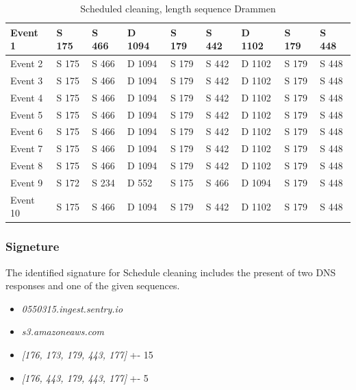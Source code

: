 \begin{table}[H]
\centering
\caption{ Scheduled cleaning, length sequence Drammen}
\label{tab:SCsequenceDrammen}
\begin{tabular}{|l|l|l|l|l|l|l|l|l|}
\hline
Event 1  & S 175   & S 466 & D 1094 & S 179 & S 442 & D 1102 & S 179 & S 448 \\ \hline
Event 2  & S 175   & S 466 & D 1094 & S 179 & S 442 & D 1102 & S 179 & S 448 \\ \hline
Event 3  & S 175   & S 466 & D 1094 & S 179 & S 442 & D 1102 & S 179 & S 448 \\ \hline
Event 4  & S 175   & S 466 & D 1094 & S 179 & S 442 & D 1102 & S 179 & S 448 \\ \hline
Event 5  & S 175   & S 466 & D 1094 & S 179 & S 442 & D 1102 & S 179 & S 448 \\ \hline
Event 6  & S 175   & S 466 & D 1094 & S 179 & S 442 & D 1102 & S 179 & S 448 \\ \hline
Event 7  & S 175   & S 466 & D 1094 & S 179 & S 442 & D 1102 & S 179 & S 448 \\ \hline
Event 8  & S 175   & S 466 & D 1094 & S 179 & S 442 & D 1102 & S 179 & S 448 \\ \hline
Event 9  & S 172   & S 234 & D 552  & S 175 & S 466 & D 1094 & S 179 & S 448 \\ \hline
Event 10 & S 175   & S 466 & D 1094 & S 179 & S 442 & D 1102 & S 179 & S 448 \\ \hline
\end{tabular}
\end{table}

\subsubsection{Signeture}
The identified signature for Schedule cleaning includes the present of two DNS responses and one of the given sequences.  

\begin{itemize}
    \item \textit{0550315.ingest.sentry.io}
    \item \textit{s3.amazoneaws.com}
    \item \textit{[176, 173, 179, 443, 177]} +- 15
    \item \textit{[176, 443, 179, 443, 177]} +- 5
\end{itemize}






